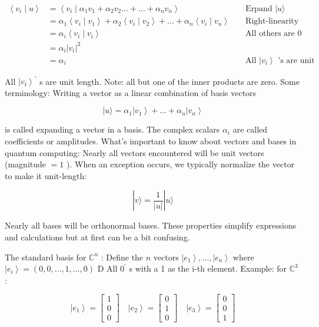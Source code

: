 \documentclass[main.tex]{subfiles}
\begin{document}
    $$
    \begin{aligned}\left\langle v_{i} \mid u\right\rangle &=\left\langle v_{i} \mid \alpha_{1} v_{1}+\alpha_{2} v_{2} \ldots+\ldots+\alpha_{n} v_{n}\right\rangle & & \text { Erpand }|u\rangle \\ &=\alpha_{1}\left\langle v_{i} \mid v_{1}\right\rangle+\alpha_{2}\left\langle v_{i} \mid v_{2}\right\rangle+\ldots+\alpha_{n}\left\langle v_{i} \mid v_{n}\right\rangle & & \text { Right-linearity of imner-product } \\ &=\alpha_{i}\left\langle v_{i} \mid v_{i}\right\rangle & & \text { All others are 0 } \\ &=\alpha_{i}\left|v_{i}\right|^{2} & & \\ &=\alpha_{i} & & \text { All }\left|v_{i}\right\rangle \text { 's are unit length } \end{aligned}
    $$

    All $\left|v_{t}\right\rangle^{\prime}$ s are unit length. Note: all but one of the inner products are zero. Some terminology: Writing a vector as a linear combination of basis vectors
    
    $$
    |u\rangle=\alpha_{1}\left|v_{1}\right\rangle+\ldots+\alpha_{n}\left|v_{n}\right\rangle
    $$
    
    is called expanding a vector in a basis. The complex scalars $\alpha_{i}$ are called coefficients or amplitudes. What's important to know about vectors and bases in quantum computing: Nearly all vectors encountered will be unit vectors (magnitude $=1$ ). When an exception occurs, we typically normalize the vector to make it unit-length:
    
    $$
    |v\rangle=\frac{1}{|u|}|u\rangle
    $$
    
    Nearly all bases will be orthonormal bases. These properties simplify expressions and calculations but at first can be a bit confusing. 
    
    The standard basis for $\mathbb{C}^{n}$ : Define the $n$ vectors $\left|e_{1}\right\rangle, \ldots,\left|e_{n}\right\rangle$ where $\left|e_{i}\right\rangle=(0,0, \ldots, 1, \ldots, 0)$ D All $0^{\prime}$ s with a 1 as the i-th element. Example: for $\mathbb{C}^{3}$ :
    
    $$
    \left|e_{1}\right\rangle=\left[\begin{array}{l}
    1 \\
    0 \\
    0
    \end{array}\right] \quad\left|e_{2}\right\rangle=\left[\begin{array}{l}
    0 \\
    1 \\
    0
    \end{array}\right] \quad\left|e_{3}\right\rangle=\left[\begin{array}{l}
    0 \\
    0 \\
    1
    \end{array}\right]
    $$
    
\end{document}
